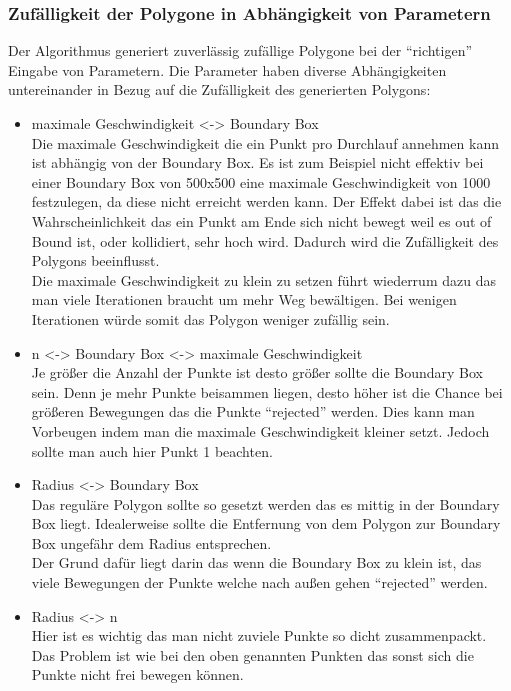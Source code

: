 \subsubsection{Zufälligkeit der Polygone in Abhängigkeit von Parametern}
Der Algorithmus generiert zuverlässig zufällige Polygone bei der \enquote{richtigen} Eingabe von Parametern. Die Parameter haben diverse Abhängigkeiten untereinander in Bezug auf die Zufälligkeit des generierten Polygons:\\
\begin{itemize}
	\item maximale Geschwindigkeit <-> Boundary Box\\
	Die maximale Geschwindigkeit die ein Punkt pro Durchlauf annehmen kann ist abhängig von der Boundary Box. Es ist zum Beispiel nicht effektiv bei einer Boundary Box von 500x500 eine maximale Geschwindigkeit von 1000 festzulegen, da diese nicht erreicht werden kann. Der Effekt dabei ist das die Wahrscheinlichkeit das ein Punkt am Ende sich nicht bewegt weil es out of Bound ist, oder kollidiert, sehr hoch wird. Dadurch wird die Zufälligkeit des Polygons beeinflusst.\\
	Die maximale Geschwindigkeit zu klein zu setzen führt wiederrum dazu das man viele Iterationen braucht um mehr Weg bewältigen. Bei wenigen Iterationen würde somit das Polygon weniger zufällig sein.
	\item n <-> Boundary Box <-> maximale Geschwindigkeit\\
	Je größer die Anzahl der Punkte ist desto größer sollte die Boundary Box sein. Denn je mehr Punkte beisammen liegen, desto höher ist die Chance bei größeren Bewegungen das die Punkte \enquote{rejected} werden. Dies kann man Vorbeugen indem man die maximale Geschwindigkeit kleiner setzt. Jedoch sollte man auch hier Punkt 1 beachten.
	\item Radius <-> Boundary Box\\
	Das reguläre Polygon sollte so gesetzt werden das es mittig in der Boundary Box liegt. Idealerweise sollte die Entfernung von dem Polygon zur Boundary Box ungefähr dem Radius entsprechen.\\
	Der Grund dafür liegt darin das wenn die Boundary Box zu klein ist, das viele Bewegungen der Punkte welche nach außen gehen \enquote{rejected} werden.
	\item Radius <-> n\\
	Hier ist es wichtig das man nicht zuviele Punkte so dicht zusammenpackt. Das Problem ist wie bei den oben genannten Punkten das sonst sich die Punkte nicht frei bewegen können.
\end{itemize}
